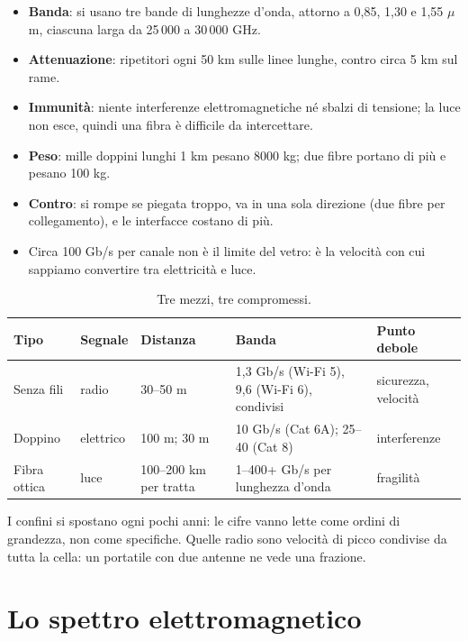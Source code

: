 \begin{itemize}
    \item \textbf{Banda}: si usano tre bande di lunghezze d'onda, attorno a 0,85, 1,30 e 1,55 $\mu$m, ciascuna larga da 25\,000 a
          30\,000 GHz.
    \item \textbf{Attenuazione}: ripetitori ogni 50 km sulle linee lunghe, contro circa 5 km sul rame.
    \item \textbf{Immunità}: niente interferenze elettromagnetiche né sbalzi di tensione; la luce non esce, quindi una fibra è difficile
          da intercettare.
    \item \textbf{Peso}: mille doppini lunghi 1 km pesano 8000 kg; due fibre portano di più e pesano 100 kg.
    \item \textbf{Contro}: si rompe se piegata troppo, va in una sola direzione (due fibre per collegamento), e le interfacce costano di
          più.
    \item Circa 100 Gb/s per canale non è il limite del vetro: è la velocità con cui sappiamo convertire tra elettricità e luce.
\end{itemize}

\begin{table}[H]
\centering
\begin{tabular}{lllll}
\toprule
\textbf{Tipo} & \textbf{Segnale} & \textbf{Distanza} & \textbf{Banda} & \textbf{Punto debole} \\
\midrule
Senza fili & radio & 30--50 m & 1,3 Gb/s (Wi-Fi 5), 9,6 (Wi-Fi 6), condivisi & sicurezza, velocità \\
Doppino & elettrico & 100 m; 30 m & 10 Gb/s (Cat 6A); 25--40 (Cat 8) & interferenze \\
Fibra ottica & luce & 100--200 km per tratta & 1--400+ Gb/s per lunghezza d'onda & fragilità \\
\bottomrule
\end{tabular}
\caption{Tre mezzi, tre compromessi.}
\end{table}

I confini si spostano ogni pochi anni: le cifre vanno lette come ordini di grandezza, non come specifiche. Quelle radio sono velocità
di picco condivise da tutta la cella: un portatile con due antenne ne vede una frazione.

\section{Lo spettro elettromagnetico}

